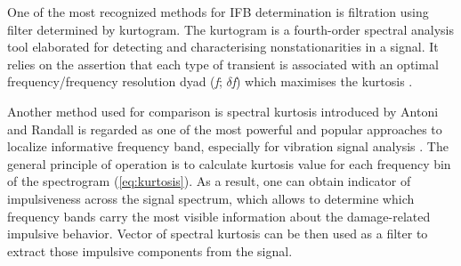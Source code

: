 \documentclass[preprint,12pt]{elsarticle}
\begin{document}
One of the most recognized methods for IFB determination is filtration using filter determined by kurtogram. The kurtogram is a fourth-order spectral analysis tool elaborated for detecting and characterising nonstationarities in a signal. It relies on the assertion that each type of transient is associated with an optimal frequency/frequency resolution dyad (\textit{f}; $\delta$\textit{f}) which maximises the kurtosis \cite{antoni2007fast}.

Another method used for comparison is spectral kurtosis introduced by Antoni and Randall is regarded as one of the most powerful and popular approaches to localize informative frequency band, especially for vibration signal analysis \cite{randall2011rolling}. The general principle of operation is to calculate kurtosis value for each frequency bin of the spectrogram (\ref{eq:kurtosis}). As a result, one can obtain indicator of impulsiveness across the signal spectrum, which allows to determine which frequency bands carry the most visible information about the damage-related impulsive behavior. Vector of spectral kurtosis can be then used as a filter to extract those impulsive components from the signal.



\end{document}
